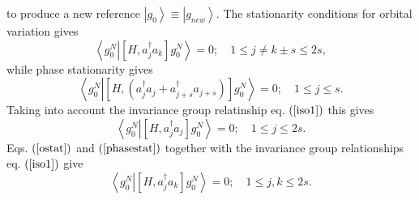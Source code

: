 \documentclass{preprint}
\begin{document}
to produce a new reference $\left\vert g_{0}\right\rangle \equiv\left\vert
g_{new}\right\rangle .$ The stationarity conditions for orbital variation
gives
\begin{equation}
\left\langle g_{0}^{N}\left\vert \left[ H,a_{j}^{\dagger}a_{k}\right]
g_{0}^{N}\right. \right\rangle =0;\quad1\leq j\neq k\pm s\leq2s,
\label{ostat}
\end{equation}
while phase stationarity gives%
\begin{equation}
\left\langle g_{0}^{N}\left\vert \left[ H,\left(
a_{j}^{\dagger}a_{j}+a_{j+s}^{\dagger}a_{j+s}\right) \right]
g_{0}^{N}\right. \right\rangle =0;\quad1\leq j\leq s.
\end{equation}
Taking into account the invariance group relatinship eq. $\left( \ref{iso1}%
\right) $ this gives
\begin{equation}
\left\langle g_{0}^{N}\left\vert \left[ H,a_{j}^{\dagger}a_{j}\right]
g_{0}^{N}\right. \right\rangle =0;\quad1\leq j\leq2s.  \label{phasestat}
\end{equation}
Eqs. $\left( \ref{ostat}\right) $ and $\left( \ref{phasestat}\right) $
together with the invariance group relationships eq. $\left( \ref{iso1}%
\right) $ give
\begin{equation}
\left\langle g_{0}^{N}\left\vert \left[ H,a_{j}^{\dagger}a_{k}\right]
g_{0}^{N}\right. \right\rangle =0;\quad1\leq j,k\leq2s.  \label{orbstat}
\end{equation}
\end{document}
